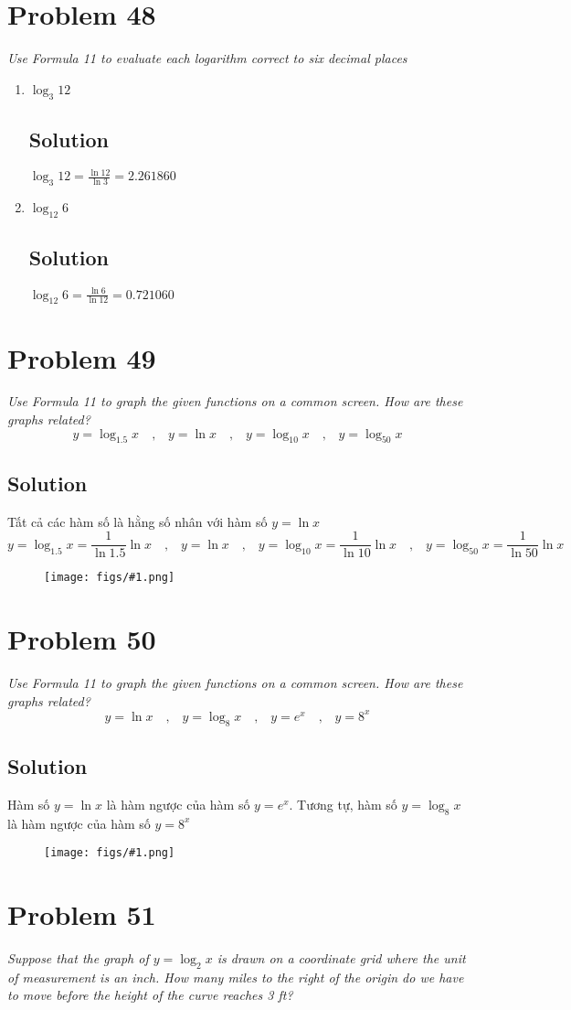 \documentclass[11pt]{article}
\newcommand{\soln}{\subsection*}
\newcommand{\qn}{\textit}
\newcommand{\imgsoln}[1]{
	\begin{figure}[H]
		\centering
		\texttt{[image: figs/\#1.png]}
	\end{figure}
}
\newcommand{\eqtext}[1]{\quad\text{#1}\quad}
\begin{document}
\section*{Problem 48}

\qn{Use Formula 11 to evaluate each logarithm correct to six decimal places}
\begin{enumerate}
	\item \qn{$\log_3{12}$}
	\soln{Solution}
	$\log_3{12}=\frac{\ln{12}}{\ln3}=2.261860$
	
	\item \qn{$\log_{12}6$}
	\soln{Solution}
	$\log_{12}6=\frac{\ln6}{\ln{12}}=0.721060$
\end{enumerate}

\section*{Problem 49}

\qn{Use Formula 11 to graph the given functions on a common screen. How are these graphs related? $$y=\log_{1.5}x \eqtext{,} y=\ln{x} \eqtext{,} y=\log_{10}x \eqtext{,} y=\log_{50}x$$}

\soln{Solution}
Tất cả các hàm số là hằng số nhân với hàm số $y=\ln{x}$ $$y=\log_{1.5}x=\frac{1}{\ln{1.5}}\ln{x} \eqtext{,} y=\ln{x} \eqtext{,} y=\log_{10}x=\frac{1}{\ln{10}}\ln{x} \eqtext{,} y=\log_{50}x=\frac{1}{\ln{50}}\ln{x}$$
\imgsoln{1.5.49-ans}

\section*{Problem 50}

\qn{Use Formula 11 to graph the given functions on a common screen. How are these graphs related? $$y=\ln{x} \eqtext{,} y=\log_8{x} \eqtext{,} y=e^x \eqtext{,} y=8^x$$}

\soln{Solution}
Hàm số $y=\ln{x}$ là hàm ngược của hàm số $y=e^x$. Tương tự, hàm số $y=\log_8{x}$ là hàm ngược của hàm số $y=8^x$
\imgsoln{1.5.50-ans}

\section*{Problem 51}

\qn{Suppose that the graph of $y=\log_2{x}$ is drawn on a coordinate grid where the unit of measurement is an inch. How many miles to the right of the origin do we have to move before the height of the curve reaches 3 ft?}
\end{document}
